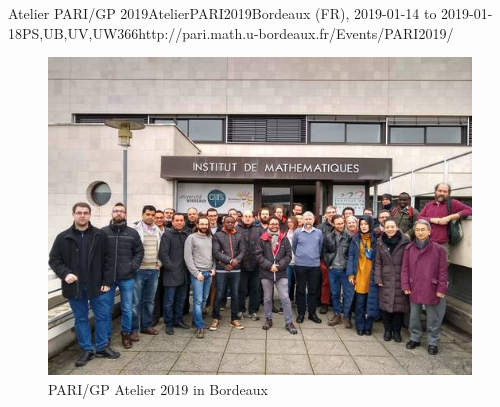 \begin{event}{Atelier PARI/GP 2019}{AtelierPARI2019}{Bordeaux (FR),
2019-01-14 to 2019-01-18}{PS,UB,UV,UW}{36}{6}{http://pari.math.u-bordeaux.fr/Events/PARI2019/}
\begin{figure}[ht]
\includegraphics[scale=0.5]{pari2019.jpg}
\caption*{PARI/GP Atelier 2019 in Bordeaux}
\end{figure}

\end{event}

